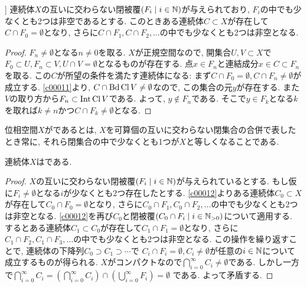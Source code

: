 \documentclass[uplatex, dvipdfmx, a4paper, 12pt, class=jsbook, crop=false]{standalone}
\begin{document}
\begin{lemma}{\cite[Lemma~6.1.26]{Engelking1989GT}}]
	\label{c00012}
	連続体$ X $の互いに交わらない閉被覆$ \setfamily{F_i}{i \in \N} $が与えられており,
	$ F_i $の中でも少なくとも2つは非空であるとする.
	このときある連続体$ C \subset X $が存在して$ C \cap F_0 = \emptyset $となり,
	さらに$ C \cap F_1, C \cap F_2, \ldots $の中でも少なくとも2つは非空となる.
\end{lemma}

\begin{proof}
	$ F_n \neq \emptyset $となる$ n \neq 0 $を取る. $ X $が正規空間なので,
	開集合$ U, V \subset X $で$ F_0 \subset U, F_n \subset V, U \cap V = \emptyset $となるものが存在する.
	点$ x \in F_n $と連結成分$ x \in C \subset F_n $を取る.
	この$ C $が所望の条件を満たす連続体になる: まず$ C \cap F_0 = \emptyset, C \cap F_n \neq \emptyset $が成立する.
	\cref{c00011}より, $ C \cap \mathop{\mathrm{Bd}}\nolimits\mathop{\mathrm{Cl}}\nolimits V \neq \emptyset $なので, この集合の元$ y $が存在する.
	また$ V $の取り方から$ F_n \subset \mathop{\mathrm{Int}}\nolimits \mathop{\mathrm{Cl}}\nolimits V $である.
	よって, $ y \notin F_n $である.
	そこで$ y \in F_k $となる$ k $を取れば$ k \neq n $かつ$ C \cap F_k \neq \emptyset $となる.
\end{proof}

\begin{definition}
	位相空間$ X $がであるとは,
	$ X $を可算個の互いに交わらない閉集合の合併で表したとき常に,
	それら閉集合の中で少なくとも1つが$ X $と等しくなることである.
\end{definition}

\begin{theorem}
	\label{c00013}
	連続体$X$は\sigmaConnected である.
\end{theorem}

\begin{proof}
	$ X $の互いに交わらない閉被覆$ \setfamily{F_i}{i \in \N} $が与えられているとする.
	もし仮に$ F_i \neq \emptyset $となる$ i $が少なくとも2つ存在したとする.
	\cref{c00012}よりある連続体$ C_0 \subset X $が存在して$ C_0 \cap  F_0 = \emptyset$となり,
	さらに$ C_0 \cap F_1, C_0 \cap F_2, \ldots $の中でも少なくとも2つは非空となる.
	\cref{c00012}を再び$ C_0 $と閉被覆$ \setfamily{C_0 \cap F_i}{i \in \N_{>0}} $について適用する.
	するとある連続体$ C_1 \subset C_0 $が存在して$ C_1 \cap  F_1 = \emptyset$となり,
	さらに$ C_1 \cap F_2, C_1 \cap F_3, \ldots $の中でも少なくとも2つは非空となる.
	この操作を繰り返すことで, 連続体の下降列$ C_0 \supset C_1 \supset \cdots $で
	$ C_i \cap F_i = \emptyset, C_i \neq \emptyset $が任意の$ i \in \mathbb{N} $について成立するものが得られる.
	$ X $がコンパクトなので$ \bigcap_{i=0}^{\infty} C_i \neq \emptyset $である.
	しかし一方で$ \bigcap_{i=0}^{\infty} C_i
	= \left(\bigcap_{i=0}^{\infty} C_i \right) \cap \left( \bigcup_{i=0}^{\infty} F_i \right) = \emptyset $ である. よって矛盾する.
\end{proof}
\end{document}
